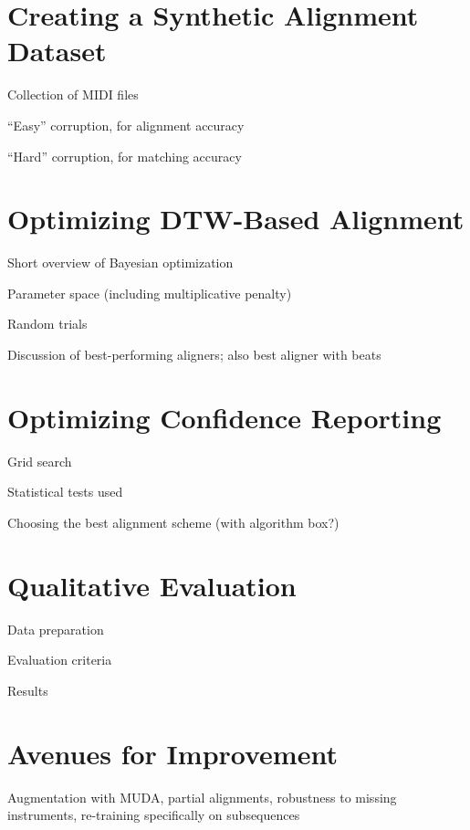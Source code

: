 \documentclass{article}
\begin{document}
\section{Creating a Synthetic Alignment Dataset}

Collection of MIDI files

``Easy'' corruption, for alignment accuracy

``Hard'' corruption, for matching accuracy

\section{Optimizing DTW-Based Alignment}

Short overview of Bayesian optimization

Parameter space (including multiplicative penalty)

Random trials

Discussion of best-performing aligners; also best aligner with beats

\section{Optimizing Confidence Reporting}

Grid search

Statistical tests used

Choosing the best alignment scheme (with algorithm box?)

\section{Qualitative Evaluation}

Data preparation

Evaluation criteria

Results

\section{Avenues for Improvement}

Augmentation with MUDA, partial alignments, robustness to missing instruments, re-training specifically on subsequences



\end{document}
